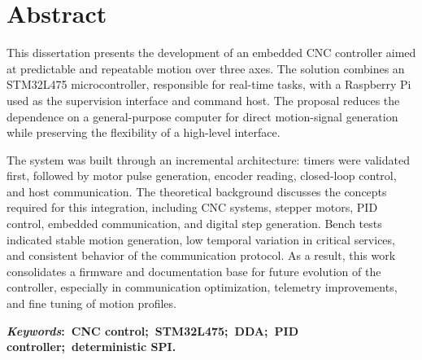 \chapter*{Abstract}
\noindent This dissertation presents the development of an embedded CNC
controller aimed at predictable and repeatable motion over three axes. The
solution combines an STM32L475 microcontroller, responsible for real-time
tasks, with a Raspberry Pi used as the supervision interface and command
host. The proposal reduces the dependence on a general-purpose computer
for direct motion-signal generation while preserving the flexibility of a
high-level interface.

The system was built through an incremental architecture: timers were
validated first, followed by motor pulse generation, encoder reading,
closed-loop control, and host communication. The theoretical background
discusses the concepts required for this integration, including CNC
systems, stepper motors, PID control, embedded communication, and digital
step generation. Bench tests indicated stable motion generation, low
temporal variation in critical services, and consistent behavior of the
communication protocol. As a result, this work consolidates a firmware and
documentation base for future evolution of the controller, especially in
communication optimization, telemetry improvements, and fine tuning of
motion profiles.

\vspace{5mm}

\noindent\textbf{\textit{Keywords}:~CNC control;~STM32L475;~DDA;~PID controller;~deterministic SPI.}
